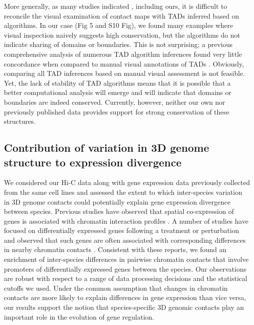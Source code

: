 More generally, as many studies indicated \cite{Dali.2017, Yan.2017, Sauerwald.2018}, including ours, it is difficult to reconcile the visual examination of contact maps with TADs inferred based on algorithms. In our case (Fig 5 and S10 Fig), we found many examples where visual inspection naively suggests high conservation, but the algorithms do not indicate sharing of domains or boundaries. This is not surprising; a previous comprehensive analysis of numerous TAD algorithm inferences found very little concordance when compared to manual visual annotations of TADs \cite{Dali.2017}. Obviously, comparing all TAD inferences based on manual visual assessment is not feasible. Yet, the lack of stability of TAD algorithms means that it is possible that a better computational analysis will emerge and will indicate that domains or boundaries are indeed conserved. Currently, however, neither our own nor previously published data provides support for strong conservation of these structures.

\subsection{Contribution of variation in 3D genome structure to expression divergence}

We considered our Hi-C data along with gene expression data previously collected from the same cell lines \cite{Pavlovic.2018} and assessed the extent to which inter-species variation in 3D genome contacts could potentially explain gene expression divergence between species. Previous studies have observed that spatial co-expression of genes is associated with chromatin interaction profiles \cite{Babaei.2015, Dong.2010, Homouz.2013, Schoenfelder.2010, Duren.2017}. A number of studies have focused on differentially expressed genes following a treatment or perturbation and observed that such genes are often associated with corresponding differences in nearby chromatin contacts \cite{Dily.2014, Chen.2017}. Consistent with these reports, we found an enrichment of inter-species differences in pairwise chromatin contacts that involve promoters of differentially expressed genes between the species. Our observations are robust with respect to a range of data processing decisions and the statistical cutoffs we used. Under the common assumption that changes in chromatin contacts are more likely to explain differences in gene expression than vice versa, our results support the notion that species-specific 3D genomic contacts play an important role in the evolution of gene regulation.

